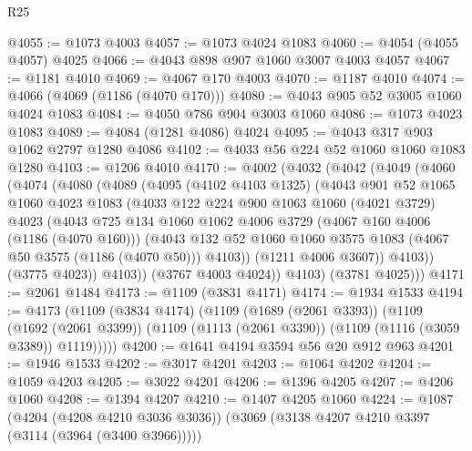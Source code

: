 \begin{lexlean}{R25}
\begin{coremodule}
@4055 := @1073 @4003
@4057 := @1073 @4024 @1083
@4060 := @4054 (@4055 @4057) @4025
@4066 := @4043 @898 @907 @1060 @3007 @4003 @4057
@4067 := @1181 @4010
@4069 := @4067 @170 @4003
@4070 := @1187 @4010
@4074 := @4066 (@4069 (@1186 (@4070 @170)))
@4080 := @4043 @905 @52 @3005 @1060 @4024 @1083
@4084 := @4050 @786 @904 @3003 @1060
@4086 := @1073 @4023 @1083
@4089 := @4084 (@1281 @4086) @4024
@4095 := @4043 @317 @903 @1062 @2797 @1280 @4086
@4102 := @4033 @56 @224 @52 @1060 @1060 @1083 @1280
@4103 := @1206 @4010
@4170 := @4002
    (@4032
      (@4042
        (@4049
          (@4060
            (@4074
              (@4080
                (@4089
                  (@4095
                    (@4102 @4103 @1325)
                    (@4043
                      @901
                      @52
                      @1065
                      @1060
                      @4023
                      @1083
                      (@4033
                        @122
                        @224
                        @900
                        @1063
                        @1060
                        (@4021 @3729)
                        @4023
                        (@4043
                          @725
                          @134
                          @1060
                          @1062
                          @4006
                          @3729
                          (@4067 @160 @4006 (@1186 (@4070 @160)))
                          (@4043
                            @132
                            @52
                            @1060
                            @1060
                            @3575
                            @1083
                            (@4067 @50 @3575 (@1186 (@4070 @50)))
                            @4103))
                        (@1211 @4006 @3607))
                      @4103))
                  (@3775 @4023))
                @4103))
            (@3767 @4003 @4024))
          @4103)
        (@3781 @4025)))
@4171 := @2061 @1484
@4173 := @1109 (@3831 @4171)
@4174 := @1934 @1533
@4194 := @4173
    (@1109
      (@3834 @4174)
      (@1109
        (@1689 (@2061 @3393))
        (@1109
          (@1692 (@2061 @3399))
          (@1109 (@1113 (@2061 @3390)) (@1109 (@1116 (@3059 @3389)) @1119)))))
@4200 := @1641 @4194 @3594 @56 @20 @912 @963
@4201 := @1946 @1533
@4202 := @3017 @4201
@4203 := @1064 @4202
@4204 := @1059 @4203
@4205 := @3022 @4201
@4206 := @1396 @4205
@4207 := @4206 @1060
@4208 := @1394 @4207
@4210 := @1407 @4205 @1060
@4224 := @1087
    (@4204 (@4208 @4210 @3036 @3036))
    (@3069 (@3138 @4207 @4210 @3397 (@3114 (@3964 (@3400 @3966)))))

\end{coremodule}
\end{lexlean}
